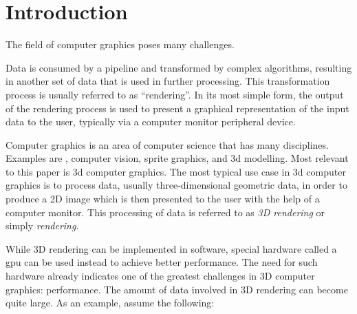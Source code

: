 
\chapter{Introduction}
\label{cha:Introduction}

  The field of computer graphics poses many challenges.

  Data is consumed by a pipeline and transformed by complex algorithms, resulting in another set of data that is used in further processing. This transformation process is usually referred to as ``rendering''. In its most simple form, the output of the rendering process is used to present a graphical representation of the input data to the user, typically via a computer monitor peripheral device.

  Computer graphics is an area of computer science that has many disciplines. Examples are , computer vision, sprite graphics, and \acrshort{3d} modelling. Most relevant to this paper is \acrfull{3d} computer graphics.  The most typical use case in \acrshort{3d} computer graphics is to process data, usually three-dimensional geometric data, in order to produce a 2D image which is then presented to the user with the help of a computer monitor. This processing of data is referred to as \textit{3D rendering} or simply \textit{rendering}.

  While 3D rendering can be implemented in software, special hardware called a \acrfull{gpu} can be used instead to achieve better performance. The need for such hardware already indicates one of the greatest challenges in 3D computer graphics: performance. The amount of data involved in 3D rendering can become quite large. As an example, assume the following:


